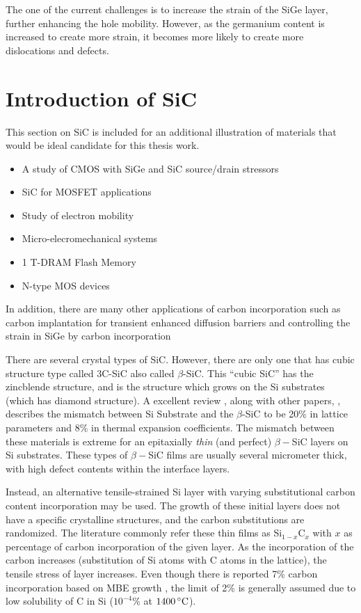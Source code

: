 The one of the current challenges is to increase the strain of the SiGe layer, further enhancing the hole mobility.  However, as the germanium content is increased to create more strain, it becomes more likely to create more dislocations and defects.



\section{Introduction of SiC}

	 This section on SiC is included for an additional illustration of materials that would be ideal candidate for this thesis work.

{\SingleSpacing
\begin{itemize}
\item A  study of CMOS with SiGe and SiC source/drain stressors \cite{Ang1}
\item SiC for MOSFET applications \cite{Itokawa1,Calmes1,Chang1}
\item Study of electron mobility \cite{Chang1}
\item Micro-elecromechanical systems \cite{Forster1}
\item 1 T-DRAM Flash Memory \cite{Han1}
\item N-type MOS devices \cite{Hartmann2, Hartmann1}
\end{itemize}
}

 In addition, there are many other applications of carbon incorporation such as carbon implantation for transient enhanced diffusion barriers \cite{Guedj1} and controlling the strain in SiGe by carbon incorporation \cite{Kramer1,Eberl1,Pantelides1}

There are several crystal types of SiC.  However, there are only one that has cubic structure type called 3C-SiC also called $\beta$-SiC.  This ``cubic SiC'' has the zincblende structure, and is the structure which grows on the Si substrates (which has diamond structure).    A excellent review \cite{Davis1}, along with other papers, \cite{Liu2,Golecki1}, describes the mismatch between Si Substrate and the $\beta$-SiC to be 20\% in lattice parameters and 8\% in thermal expansion coefficients. The mismatch between these materials is extreme for an epitaxially  \emph{thin} (and perfect) $\beta-$SiC layers on Si substrates.  These types of $\beta-$SiC films are usually several micrometer thick, with high defect contents within the interface layers.

Instead, an alternative tensile-strained Si layer with varying substitutional carbon content incorporation may be used.  The growth of these initial layers does not have a specific crystalline structures, and the carbon substitutions are randomized.  The literature commonly refer these thin films as Si$_{1-x}$C$_x$ with $x$ as percentage of carbon incorporation of the given layer.  As the incorporation of the carbon increases (substitution of Si atoms with C atoms in the lattice), the tensile stress of layer increases.  Even though there is reported 7\% carbon incorporation based on MBE growth \cite{Eberl1}, the limit of 2\% is generally assumed due to low solubility of C in Si ($10^{-4}\%$ at $1400 \,^{\circ}\mathrm{C}$)\cite{Hartmann1}.

